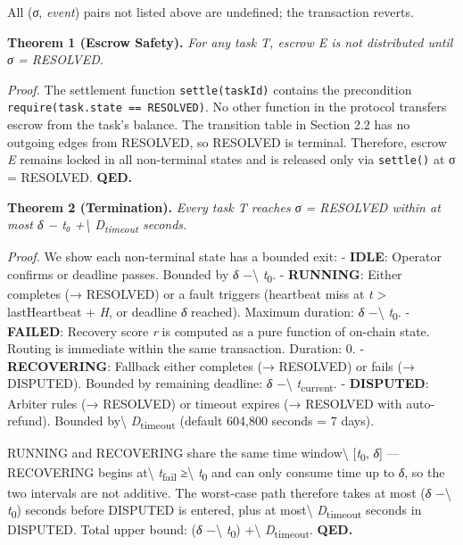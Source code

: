 \documentclass[
  10pt,
]{article}
\begin{document}
All (\emph{σ}, \emph{event}) pairs not listed above are undefined; the
transaction reverts.

\textbf{Theorem 1 (Escrow Safety).} \emph{For any task T, escrow E is
not distributed until σ = RESOLVED.}

\emph{Proof.} The settlement function \texttt{settle(taskId)} contains
the precondition \texttt{require(task.state\ ==\ RESOLVED)}. No other
function in the protocol transfers escrow from the task's balance. The
transition table in Section 2.2 has no outgoing edges from RESOLVED, so
RESOLVED is terminal. Therefore, escrow \emph{E} remains locked in all
non-terminal states and is released only via \texttt{settle()} at σ =
RESOLVED. \textbf{QED.}

\textbf{Theorem 2 (Termination).} \emph{Every task T reaches σ =
RESOLVED within at most δ − t₀ +\textbackslash{}
D\textsubscript{timeout} seconds.}

\emph{Proof.} We show each non-terminal state has a bounded exit: -
\textbf{IDLE}: Operator confirms or deadline passes. Bounded by \emph{δ}
−\textbackslash{} \emph{t}\textsubscript{0}. - \textbf{RUNNING}: Either
completes (→ RESOLVED) or a fault triggers (heartbeat miss at \emph{t}
\textgreater{} lastHeartbeat + \emph{H}, or deadline \emph{δ} reached).
Maximum duration: \emph{δ} −\textbackslash{} \emph{t}\textsubscript{0}.
- \textbf{FAILED}: Recovery score \emph{r} is computed as a pure
function of on-chain state. Routing is immediate within the same
transaction. Duration: 0. - \textbf{RECOVERING}: Fallback either
completes (→ RESOLVED) or fails (→ DISPUTED). Bounded by remaining
deadline: \emph{δ} −\textbackslash{} \emph{t}\textsubscript{current}. -
\textbf{DISPUTED}: Arbiter rules (→ RESOLVED) or timeout expires (→
RESOLVED with auto-refund). Bounded by\textbackslash{}
\emph{D}\textsubscript{timeout} (default 604,800 seconds = 7 days).

RUNNING and RECOVERING share the same time window\textbackslash{}
{[}\emph{t}\textsubscript{0}, \emph{δ}{]} --- RECOVERING begins
at\textbackslash{} \emph{t}\textsubscript{fail} ≥\textbackslash{}
\emph{t}\textsubscript{0} and can only consume time up to \emph{δ}, so
the two intervals are not additive. The worst-case path therefore takes
at most (\emph{δ} −\textbackslash{} \emph{t}\textsubscript{0}) seconds
before DISPUTED is entered, plus at most\textbackslash{}
\emph{D}\textsubscript{timeout} seconds in DISPUTED. Total upper bound:
(\emph{δ} −\textbackslash{} \emph{t}\textsubscript{0}) +\textbackslash{}
\emph{D}\textsubscript{timeout}. \textbf{QED.}
\end{document}
